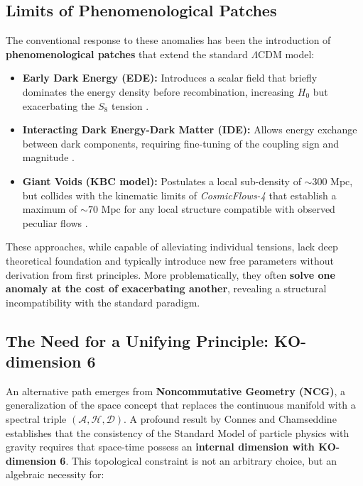 \documentclass[11pt, a4paper]{article}
\theoremstyle{plain}
\theoremstyle{definition}
\begin{document}
\subsection{Limits of Phenomenological Patches}

The conventional response to these anomalies has been the introduction of \textbf{phenomenological patches} that extend the standard $\Lambda$CDM model:

\begin{itemize}
    \item \textbf{Early Dark Energy (EDE):} Introduces a scalar field that briefly dominates the energy density before recombination, increasing $H_0$ but exacerbating the $S_8$ tension \cite{Poulin2019}.
    
    \item \textbf{Interacting Dark Energy-Dark Matter (IDE):} Allows energy exchange between dark components, requiring fine-tuning of the coupling sign and magnitude \cite{DiValentino2020}.
    
    \item \textbf{Giant Voids (KBC model):} Postulates a local sub-density of $\sim 300$ Mpc, but collides with the kinematic limits of \textit{CosmicFlows-4} that establish a maximum of $\sim 70$ Mpc for any local structure compatible with observed peculiar flows \cite{Mazurenko2024}.
\end{itemize}

These approaches, while capable of alleviating individual tensions, lack deep theoretical foundation and typically introduce new free parameters without derivation from first principles. More problematically, they often \textbf{solve one anomaly at the cost of exacerbating another}, revealing a structural incompatibility with the standard paradigm.

\subsection{The Need for a Unifying Principle: KO-dimension 6}

An alternative path emerges from \textbf{Noncommutative Geometry (NCG)}, a generalization of the space concept that replaces the continuous manifold with a spectral triple $(\mathcal{A}, \mathcal{H}, \mathcal{D})$. A profound result by Connes and Chamseddine \cite{Connes2012} establishes that the consistency of the Standard Model of particle physics with gravity requires that space-time possess an \textbf{internal dimension with KO-dimension 6}. This topological constraint is not an arbitrary choice, but an algebraic necessity for:
\end{document}

